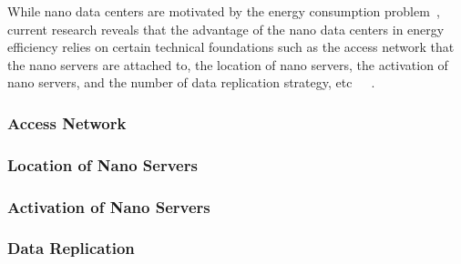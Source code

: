 While nano data centers are motivated by the energy consumption problem~\cite{DBLP:conf/conext/ValanciusLMDR09},
current research reveals that the advantage of the nano data centers in energy efficiency relies on certain technical foundations such as the access network that the nano servers are attached to, the location of nano servers, the activation of nano servers, and the number of data replication strategy, etc~\cite{DBLP:journals/sigmetrics/JalaliAVHAT14}~\cite{tradeoff}~\cite{iptv}.

\subsubsection{Access Network}

\subsubsection{Location of Nano Servers}

\subsubsection{Activation of Nano Servers}

\subsubsection{Data Replication}